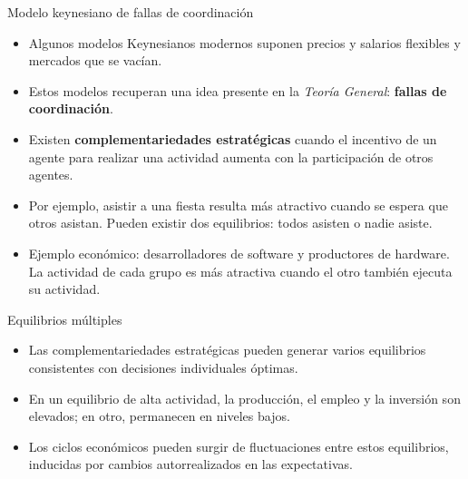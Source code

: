 \documentclass[aspectratio=169,11pt]{beamer}
\newcommand{\cidehighlight}[1]{\textcolor{CIDEBlue}{\bfseries #1}}
\begin{document}
\begin{frame}{Modelo keynesiano de fallas de coordinación}
  \begin{itemize}
    \setlength{\itemsep}{0.55em}

    \item Algunos modelos Keynesianos modernos suponen precios y salarios flexibles y mercados que se vacían.

    \item Estos modelos recuperan una idea presente en la \textit{Teoría General}: \cidehighlight{fallas de coordinación}.

    \item Existen \cidehighlight{complementariedades estratégicas} cuando el incentivo de un agente para realizar una actividad aumenta con la participación de otros agentes.

    \item Por ejemplo, asistir a una fiesta resulta más atractivo cuando se espera que otros asistan. Pueden existir dos equilibrios: todos asisten o nadie asiste.

    \item Ejemplo económico: desarrolladores de software y productores de hardware. La actividad de cada grupo es más atractiva cuando el otro también ejecuta su actividad.
  \end{itemize}
\end{frame}

\begin{frame}{Equilibrios múltiples}
  \begin{itemize}
    \setlength{\itemsep}{0.65em}

    \item Las complementariedades estratégicas pueden generar varios equilibrios consistentes con decisiones individuales óptimas.

    \item En un equilibrio de alta actividad, la producción, el empleo y la inversión son elevados; en otro, permanecen en niveles bajos.

    \item Los ciclos económicos pueden surgir de fluctuaciones entre estos equilibrios, inducidas por cambios autorrealizados en las expectativas.
  \end{itemize}
\end{frame}
\end{document}
